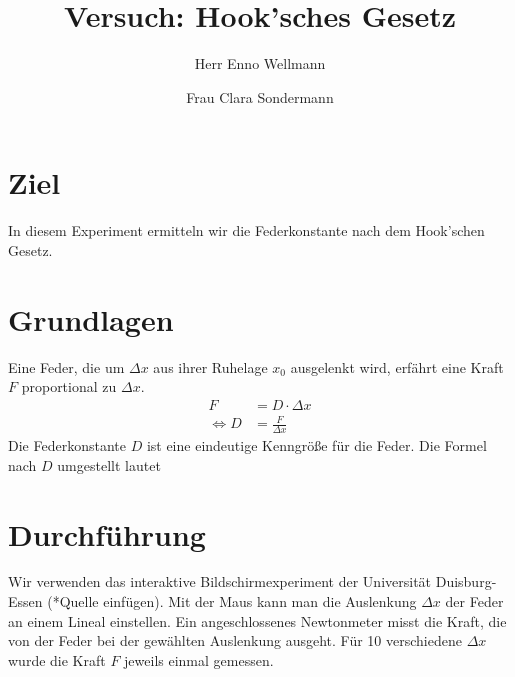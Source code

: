 

\author{Herr Enno Wellmann \and Frau Clara Sondermann} %
\title{Versuch: Hook'sches Gesetz}


\maketitle

\section[short]{Ziel}
In diesem Experiment ermitteln wir die Federkonstante nach dem Hook'schen Gesetz.

\section{Grundlagen}
Eine Feder, die um $ \Delta x $ aus ihrer Ruhelage $ x_0 $ ausgelenkt wird, erfährt eine Kraft $ F $ 
proportional zu $ \Delta x $.
\begin{align}
                    F &= D \cdot \Delta x \\
    \Leftrightarrow D &= \frac{F}{\Delta x}
\end{align}
Die Federkonstante $ D $ ist eine eindeutige Kenngröße für die Feder.
Die Formel nach $ D $ umgestellt lautet $  $

\section{Durchführung}
Wir verwenden das interaktive Bildschirmexperiment der Universität Duisburg-Essen (*Quelle einfügen).
Mit der Maus kann man die Auslenkung $ \Delta x $ der Feder an einem Lineal einstellen. 
Ein angeschlossenes Newtonmeter misst die Kraft, die von der Feder bei der gewählten Auslenkung ausgeht.
Für 10 verschiedene $ \Delta x $ wurde die Kraft $ F $ jeweils einmal gemessen.










